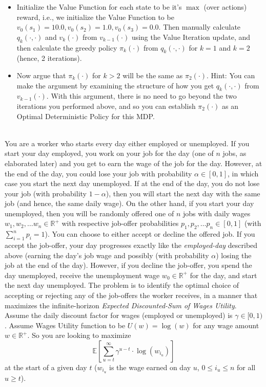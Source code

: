 \documentclass[12pt]{exam}
\begin{document}
\begin{questions}
\begin{itemize}
	\item Initialize the Value Function for each state to be it's $\max$ (over actions) reward, i.e., we initialize the Value Function to be $v_0(s_1) = 10.0, v_0(s_2) = 1.0, v_0(s_3) = 0.0$. Then manually calculate $q_k(\cdot, \cdot)$ and $v_k(\cdot)$ from $v_{k - 1}( \cdot)$ using the Value Iteration update, and then calculate the greedy policy $\pi_k(\cdot)$ from $q_k(\cdot, \cdot)$ for $k = 1$ and $k = 2$ (hence, 2 iterations).
	
	\item Now argue that $\pi_k(\cdot)$ for $k > 2$ will be the same as $\pi_2(\cdot)$. Hint: You can make the argument by examining the structure of how you get $q_k(\cdot, \cdot)$ from $v_{k-1}(\cdot)$. With this argument, there is no need to go beyond the two iterations you performed above, and so you can establish $\pi_2(\cdot)$ as an Optimal Deterministic Policy for this MDP.
\end{itemize}

 \\ You are a worker who starts every day either employed or unemployed. If you start your day employed, you work on your job for the day (one of $n$ jobs, as elaborated later) and you get to earn the wage of the job for the day. However, at the end of the day, you could lose your job with probability $\alpha \in [0,1]$, in which case you start the next day unemployed. If at the end of the day, you do not lose your job (with probability $1-\alpha$), then you will start the next day with the same job (and hence, the same daily wage). On the other hand, if you start your day unemployed, then you will be randomly offered one of $n$ jobs with daily wages $w_1, w_2, \ldots w_n \in \mathbb{R}^+$ with respective job-offer probabilities $p_1, p_2, \ldots p_n \in [0,1]$ (with $\sum_{i=1}^n p_i = 1$). You can choose to either accept or decline the offered job. If you accept the job-offer, your day progresses exactly like the {\em employed-day} described above (earning the day's job wage and possibly (with probability $\alpha$) losing the job at the end of the day). However, if you decline the job-offer, you spend the day unemployed, receive the unemployment wage $w_0 \in \mathbb{R}^+$ for the day, and start the next day unemployed. The problem is to identify the optimal choice of accepting or rejecting any of the job-offers the worker receives, in a manner that maximizes the infinite-horizon {\em Expected Discounted-Sum of Wages Utility}. Assume the daily discount factor for wages (employed or unemployed) is $\gamma \in [0,1)$. Assume Wages Utility function to be $U(w) = \log(w)$ for any wage amount $w \in \mathbb{R}^+$. So you are looking to maximize
$$\mathbb{E}[\sum_{u=t}^\infty \gamma^{u-t} \cdot \log(w_{i_u})]$$
at the start of a given day $t$ ($w_{i_u}$ is the wage earned on day $u$, $0\leq i_u \leq n$ for all $u\geq t$).


\end{questions}
\end{document}
